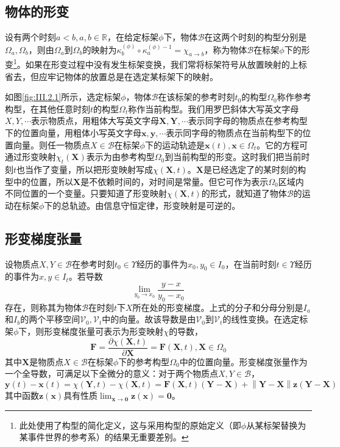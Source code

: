 \documentclass[main.tex]{subfiles}
\begin{document}
\subsection{物体的形变}
设有两个时刻$a<b,a,b\in\mathbb{R}$，在给定标架$\phi$下，物体$\mathcal{B}$在这两个时刻的构型分别是$\Omega_a,\Omega_b$，则由$\Omega_a$到$\Omega_b$的映射为$\kappa^{\left(\phi\right)}_{b}\circ\kappa_{a}^{\left(\phi\right)-1}=\chi_{a\to b}$，称为物体$\mathcal{B}$在标架$\phi$下的形变\footnote{此处使用了构型的简化定义，这与采用构型的原始定义（即$\phi$从某标架替换为某事件世界的参考系）的结果无重要差别。}。如果在形变过程中没有发生标架变换，我们常将标架符号从放置映射的上标省去，但应牢记物体的放置总是在选定某标架下的映射。

如图\ref{fig:III.2.1}所示，选定标架$\phi$，物体$\mathcal{B}$在该标架的参考时刻$t_0$的构型$\Omega_0$称作参考构型，在其他任意时刻$t$的构型$\Omega_t$称作当前构型。我们用罗巴斜体大写英文字母$X,Y,\cdots$表示物质点，用粗体大写英文字母$\mathbf{X},\mathbf{Y},\cdots$表示同字母的物质点在参考构型下的位置向量，用粗体小写英文字母$\mathbf{x},\mathbf{y},\cdots$表示同字母的物质点在当前构型下的位置向量。则任一物质点$X\in\mathcal{B}$在标架$\phi$下的运动轨迹是$\mathbf{x}\left(t\right),\mathbf{x}\in\Omega_t$。它的方程可通过形变映射$\chi_t\left(\mathbf{X}\right)$表示为由参考构型$\Omega_0$到当前构型的形变。这时我们把当前时刻$t$也当作了变量，所以把形变映射写成$\chi\left(\mathbf{X},t\right)$。$\mathbf{X}$是已经选定了的某时刻的构型中的位置，所以$\mathbf{X}$是不依赖时间的，对时间是常量。但它可作为表示$\Omega_0$区域内不同位置的一个变量。只要知道了形变映射$\chi\left(\mathbf{X},t\right)$的形式，就知道了物体$\mathcal{B}$的运动在标架$\phi$下的总轨迹。由信息守恒定律，形变映射是可逆的。

\subsection{形变梯度张量}
设物质点$X,Y\in\mathcal{B}$在参考时刻$t_0\in\Upsilon$经历的事件为$x_0,y_0\in I_0$，在当前时刻$t\in\Upsilon$经历的事件为$x,y\in I_t$。若导数
\[\lim_{y_0\to x_0}\frac{y-x}{y_0-x_0}\]
存在，则称其为物体$\mathcal{B}$在时刻$t$下$X$所在处的形变梯度。上式的分子和分母分别是$I_a$和$I_b$的两个平移空间$\mathcal{V}_0,\mathcal{V}_t$中的向量。故该导数是由$\mathcal{V}_0$到$\mathcal{V}_t$的线性变换。在选定标架$\phi$下，则形变梯度张量可表示为形变映射$\chi$的导数，
\[\mathbf{F}=\frac{\partial\chi\left(\mathbf{X},t\right)}{\partial\mathbf{X}}=\mathbf{F}\left(\mathbf{X},t\right),\mathbf{X}\in\Omega_0
\]
其中$\mathbf{X}$是物质点$X\in\mathcal{B}$在标架$\phi$下的参考构型$\Omega_0$中的位置向量。形变梯度张量作为一个全导数，可满足以下全微分的意义：对于两个物质点$X,Y\in\mathcal{B}$，
\[\mathbf{y}\left(t\right)-\mathbf{x}\left(t\right)=\chi\left(\mathbf{Y},t\right)-\chi\left(\mathbf{X},t\right)=\mathbf{F}\left(\mathbf{X},t\right)\left(\mathbf{Y}-\mathbf{X}\right)+\left\|\mathbf{Y}-\mathbf{X}\right\|\mathbf{z}\left(\mathbf{Y}-\mathbf{X}\right)\]
其中函数$\mathbf{z}\left(\mathbf{x}\right)$具有性质$\lim_{\mathbf{x}\to\mathbf{0}}\mathbf{z}\left(\mathbf{x}\right)=\mathbf{0}$。
\end{document}
